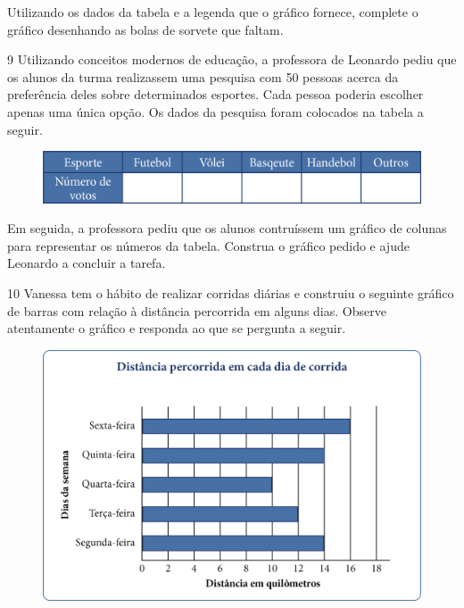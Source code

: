 Utilizando os dados da tabela e a legenda que o gráfico fornece,
complete o gráfico desenhando as bolas de sorvete que faltam.


\pagebreak
\num{9} Utilizando conceitos modernos de educação, a professora de Leonardo
pediu que os alunos da turma realizassem uma pesquisa com 50 pessoas acerca da
preferência deles sobre determinados esportes. Cada pessoa poderia escolher
apenas uma única opção. Os dados da pesquisa foram colocados na tabela
a seguir.

\begin{figure}[htpb!]
\centering
\includegraphics[width=\textwidth]{media/image48.png}
\end{figure}

Em seguida, a professora pediu que os alunos contruíssem um gráfico de
colunas para representar os números da tabela. Construa o gráfico pedido
e ajude Leonardo a concluir a tarefa.

\begin{mdframed}[linewidth=2pt,linecolor=salmao,roundcorner=2pt]
\vspace{14cm}
\end{mdframed}

\num{10} Vanessa tem o hábito de realizar corridas diárias e construiu o seguinte
gráfico de barras com relação à distância percorrida em alguns dias. 
Observe atentamente o gráfico e responda ao que se pergunta a seguir.

\begin{figure}[htpb!]
\centering
\includegraphics[width=\textwidth]{media/image49.png}
\end{figure}

